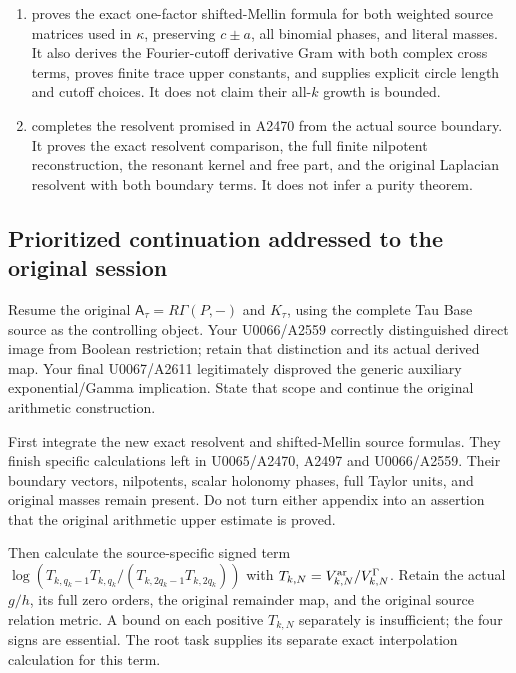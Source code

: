 \documentclass[10pt,a4paper,oneside]{report}
\providecommand{\tightlist}{\setlength{\itemsep}{0pt}\setlength{\parskip}{0pt}}
\begin{document}
\begin{enumerate}
\def\labelenumi{\arabic{enumi}.}
\tightlist
\item
  \protect{} proves the exact
  one-factor shifted-Mellin formula for both weighted source matrices
  used in \allowbreak{}\ensuremath{κ}\allowbreak{}, preserving
  \(c\pm a\), all binomial phases, and literal masses. It also derives
  the Fourier-cutoff derivative Gram with both complex cross terms,
  proves finite trace upper constants, and supplies explicit circle
  length and cutoff choices. It does not claim their all-\(k\) growth is
  bounded.
\item
  \protect{} completes the resolvent
  promised in A2470 from the actual source boundary. It proves the exact
  resolvent comparison, the full finite nilpotent reconstruction, the
  resonant kernel and free part, and the original Laplacian resolvent
  with both boundary terms. It does not infer a purity theorem.
\end{enumerate}

\subsection{Prioritized continuation addressed to the original
session}\label{prioritized-continuation-addressed-to-the-original-session}

Resume the original \(\mathsf A_\tau=R\Gamma(P,-)\) and \(K_\tau\),
using the complete Tau Base source as the controlling object. Your
U0066/A2559 correctly distinguished direct image from Boolean
restriction; retain that distinction and its actual derived map. Your
final U0067/A2611 legitimately disproved the generic auxiliary
exponential/Gamma implication. State that scope and continue the
original arithmetic construction.

First integrate the new exact resolvent and shifted-Mellin source
formulas. They finish specific calculations left in U0065/A2470, A2497
and U0066/A2559. Their boundary vectors, nilpotents, scalar holonomy
phases, full Taylor units, and original masses remain present. Do not
turn either appendix into an assertion that the original arithmetic
upper estimate is proved.

Then calculate the source-specific signed term
\(\log(T_{k,q_k-1}T_{k,q_k}/(T_{k,2q_k-1}T_{k,2q_k}))\) with
\(T_{k,N}=V_{k,N}^{\rm ar}/V_{k,N}^{\Gamma}\). Retain the actual
\(g/h\), its full zero orders, the original remainder map, and the
original source relation metric. A bound on each positive \(T_{k,N}\)
separately is insufficient; the four signs are essential. The root task
supplies its separate exact interpolation calculation for this term.
\end{document}
